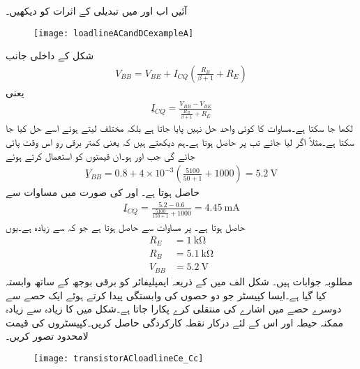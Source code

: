آئیں اب  اور   میں تبدیلی کے اثرات کو دیکھیں۔
%
\begin{figure}
\centering
\texttt{[image: loadlineACandDCexampleA]}
\caption{}
\label{شکل_ٹرانزسٹر_بدلتی_رو_بار_خط_مثال_الف}
\end{figure}
%
شکل  کے داخلی جانب 
\begin{align}\label{مساوات_ٹرانزسٹر_اسباب_مثال}
V_{BB}=V_{BE}+I_{CQ} \left(\frac{R_B}{\beta+1}+R_E \right)
\end{align}
یعنی
\begin{align}\label{مساوات_ٹرانزسٹر_اسباب_مثال_ب}
ِI_{CQ}=\frac{V_{BB}-V_{BE}}{\frac{R_B}{\beta+1}+R_E}
\end{align}
لکھا جا سکتا ہے۔مساوات  کا کوئی واحد حل نہیں پایا جاتا ہے بلکہ مختلف  لیتے ہوئے اسے حل کیا جا سکتا ہے۔مثلاً اگر  لیا جائے تب  پر  حاصل ہوتا ہے۔ہم دیکھتے ہیں کہ  یعنی کمتر برقی رو اس وقت پائی جائے گی جب  اور  ہو۔ان قیمتوں کو استعمال کرتے ہوئے
\begin{align*}
ِV_{BB}=0.8+4 \times 10^{-3} \left(\frac{5100}{50+1}+1000 \right)=\SI{5.2}{\volt}
\end{align*}
حاصل ہوتا ہے۔ اور  کی صورت میں مساوات  سے
\begin{align*}
ِI_{CQ}=\frac{5.2-0.6}{\frac{5100}{150+1}+1000}=\SI{4.45}{\milli \ampere}
\end{align*}
حاصل ہوتا ہے۔ پر مساوات  سے  حاصل ہوتا ہے جو کہ  سے زیادہ ہے۔یوں
\begin{align*}
R_E&=\SI{1}{\kilo \ohm}\\
R_B&=\SI{5.1}{\kilo \ohm}\\
V_{BB}&=\SI{5.2}{\volt}
\end{align*}
مطلوبہ جوابات ہیں۔ 
شکل  الف میں  کے ذریعہ ایمپلیفائر کو برقی بوجھ  کے ساتھ وابستہ کیا گیا ہے۔ایسا کپیسٹر جو دو حصوں کی وابستگی پیدا کرتے ہوئے ایک حصے سے دوسرے حصے میں اشارے کی منتقلی کرے  پکارا جاتا ہے۔شکل میں  کا زیادہ سے زیادہ ممکنہ حیطہ اور اس کے لئے درکار نقطہ کارکردگی حاصل کریں۔کپیسٹروں کی قیمت لامحدود تصور کریں۔ 
\begin{figure}
\centering
\texttt{[image: transistorACloadlineCe\_Cc]}
\caption{}
\label{شکل_ٹرانزسٹر_بدلتی_رو_بار_خط_مثال_ب}
\end{figure}

